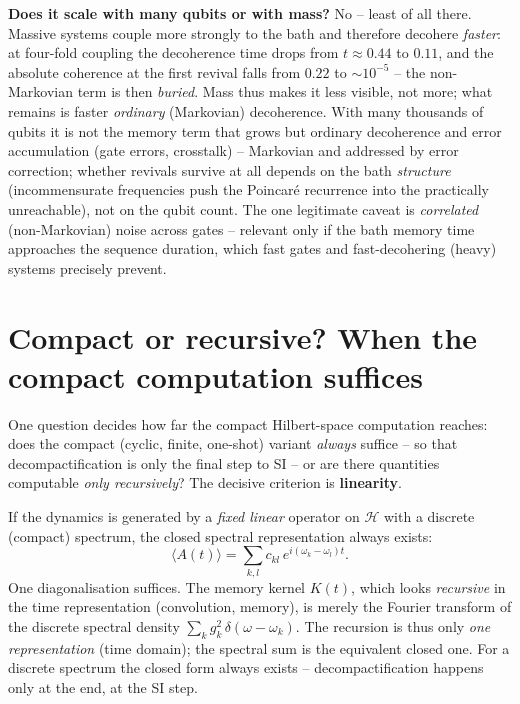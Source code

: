 \smallskip
\noindent\textbf{Does it scale with many qubits or with mass?} No -- least of all
there. Massive systems couple more strongly to the bath and therefore decohere
\emph{faster}: at four-fold coupling the decoherence time drops from
$t\approx0.44$ to $0.11$, and the absolute coherence at the first revival falls
from $0.22$ to $\sim10^{-5}$ -- the non-Markovian term is then \emph{buried}. Mass
thus makes it less visible, not more; what remains is faster \emph{ordinary}
(Markovian) decoherence. With many thousands of qubits it is not the memory term
that grows but ordinary decoherence and error accumulation (gate errors,
crosstalk) -- Markovian and addressed by error correction; whether revivals
survive at all depends on the bath \emph{structure} (incommensurate frequencies
push the Poincar\'e recurrence into the practically unreachable), not on the qubit
count. The one legitimate caveat is \emph{correlated} (non-Markovian) noise across
gates -- relevant only if the bath memory time approaches the sequence duration,
which fast gates and fast-decohering (heavy) systems precisely prevent.

\section{Compact or recursive? When the compact computation suffices}

One question decides how far the compact Hilbert-space computation reaches:
does the compact (cyclic, finite, one-shot) variant \emph{always} suffice --
so that decompactification is only the final step to SI -- or are there
quantities computable \emph{only recursively}? The decisive criterion is
\textbf{linearity}.

\begin{keyresult}
If the dynamics is generated by a \emph{fixed linear} operator on $\mathcal{H}$
with a discrete (compact) spectrum, the closed spectral representation always
exists:
\begin{equation}
  \langle A(t)\rangle=\sum_{k,l}c_{kl}\,e^{i(\omega_k-\omega_l)t}.
\end{equation}
One diagonalisation suffices. The memory kernel $K(t)$, which looks
\emph{recursive} in the time representation (convolution, memory), is merely the
Fourier transform of the discrete spectral density
$\sum_k g_k^2\,\delta(\omega-\omega_k)$. The recursion is thus only \emph{one
representation} (time domain); the spectral sum is the equivalent closed one.
For a discrete spectrum the closed form always exists -- decompactification
happens only at the end, at the SI step.
\end{keyresult}


